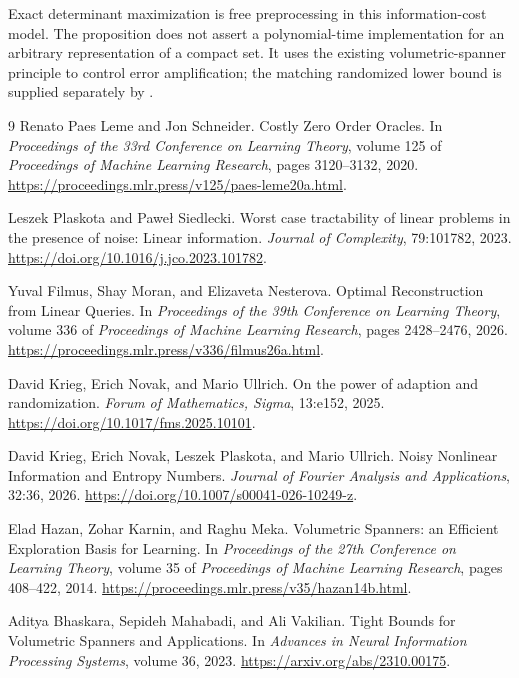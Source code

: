 \documentclass[11pt,a4paper]{article}
\theoremstyle{definition}
\theoremstyle{remark}
\begin{document}
Exact determinant maximization is free preprocessing in this information-cost model. The proposition does not assert a polynomial-time implementation for an arbitrary representation of a compact set. It uses the existing volumetric-spanner principle to control error amplification; the matching randomized lower bound is supplied separately by .

\begin{thebibliography}{9}
Renato Paes Leme and Jon Schneider.
\newblock Costly Zero Order Oracles.
\newblock In \emph{Proceedings of the 33rd Conference on Learning Theory},
  volume 125 of \emph{Proceedings of Machine Learning Research}, pages 3120--3132, 2020.
\newblock \url{https://proceedings.mlr.press/v125/paes-leme20a.html}.

Leszek Plaskota and Pawe{\l} Siedlecki.
\newblock Worst case tractability of linear problems in the presence of noise: Linear information.
\newblock \emph{Journal of Complexity}, 79:101782, 2023.
\newblock \url{https://doi.org/10.1016/j.jco.2023.101782}.

Yuval Filmus, Shay Moran, and Elizaveta Nesterova.
\newblock Optimal Reconstruction from Linear Queries.
\newblock In \emph{Proceedings of the 39th Conference on Learning Theory},
  volume 336 of \emph{Proceedings of Machine Learning Research}, pages 2428--2476, 2026.
\newblock \url{https://proceedings.mlr.press/v336/filmus26a.html}.

David Krieg, Erich Novak, and Mario Ullrich.
\newblock On the power of adaption and randomization.
\newblock \emph{Forum of Mathematics, Sigma}, 13:e152, 2025.
\newblock \url{https://doi.org/10.1017/fms.2025.10101}.

David Krieg, Erich Novak, Leszek Plaskota, and Mario Ullrich.
\newblock Noisy Nonlinear Information and Entropy Numbers.
\newblock \emph{Journal of Fourier Analysis and Applications}, 32:36, 2026.
\newblock \url{https://doi.org/10.1007/s00041-026-10249-z}.

Elad Hazan, Zohar Karnin, and Raghu Meka.
\newblock Volumetric Spanners: an Efficient Exploration Basis for Learning.
\newblock In \emph{Proceedings of the 27th Conference on Learning Theory},
  volume 35 of \emph{Proceedings of Machine Learning Research}, pages 408--422, 2014.
\newblock \url{https://proceedings.mlr.press/v35/hazan14b.html}.

Aditya Bhaskara, Sepideh Mahabadi, and Ali Vakilian.
\newblock Tight Bounds for Volumetric Spanners and Applications.
\newblock In \emph{Advances in Neural Information Processing Systems}, volume 36, 2023.
\newblock \url{https://arxiv.org/abs/2310.00175}.


\end{thebibliography}
\end{document}
